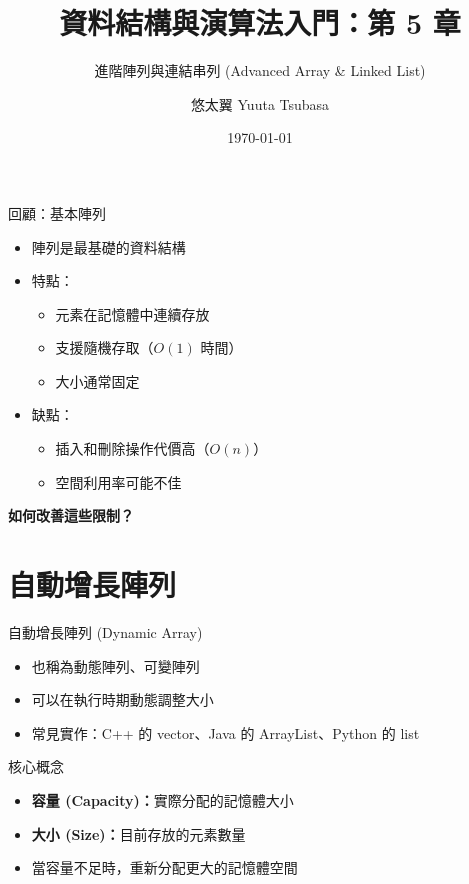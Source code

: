 \documentclass{beamer}
\begin{document}
\title{資料結構與演算法入門：第 5 章}
\subtitle{進階陣列與連結串列 (Advanced Array \& Linked List)}
\author{悠太翼 Yuuta Tsubasa}
\date{\today}

\frame{\titlepage}

\begin{frame}{回顧：基本陣列}
\begin{itemize}
    \item 陣列是最基礎的資料結構
    \item 特點：
    \begin{itemize}
        \item 元素在記憶體中連續存放
        \item 支援隨機存取（$O(1)$ 時間）
        \item 大小通常固定
    \end{itemize}
    \item 缺點：
    \begin{itemize}
        \item 插入和刪除操作代價高（$O(n)$）
        \item 空間利用率可能不佳
    \end{itemize}
\end{itemize}

\vspace{1em}
\begin{center}
\textbf{如何改善這些限制？}
\end{center}
\end{frame}

\section{自動增長陣列}

\begin{frame}{自動增長陣列 (Dynamic Array)}
\begin{itemize}
    \item 也稱為動態陣列、可變陣列
    \item 可以在執行時期動態調整大小
    \item 常見實作：C++ 的 vector、Java 的 ArrayList、Python 的 list
\end{itemize}

\vspace{1em}
\begin{block}{核心概念}
\begin{itemize}
    \item \textbf{容量 (Capacity)：}實際分配的記憶體大小
    \item \textbf{大小 (Size)：}目前存放的元素數量
    \item 當容量不足時，重新分配更大的記憶體空間
\end{itemize}
\end{block}
\end{frame}
\end{document}
